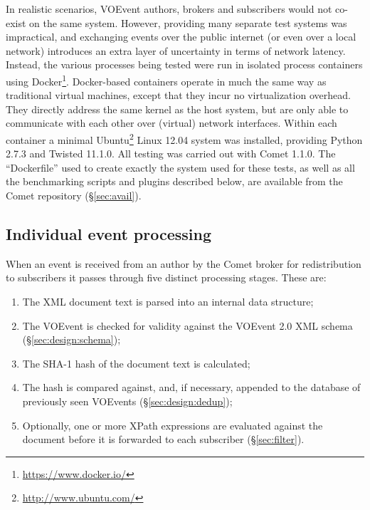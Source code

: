 \documentclass[5p,authoryear]{elsarticle}
\begin{document}
In realistic scenarios, VOEvent authors, brokers and subscribers would not
co-exist on the same system. However, providing many separate test systems was
impractical, and exchanging events over the public internet (or even over a
local network) introduces an extra layer of uncertainty in terms of network
latency. Instead, the various processes being tested were run in isolated
process containers using Docker\footnote{\url{https://www.docker.io/}}.
Docker-based containers operate in much the same way as traditional virtual
machines, except that they incur no virtualization overhead. They directly
address the same kernel as the host system, but are only able to communicate
with each other over (virtual) network interfaces. Within each container a
minimal Ubuntu\footnote{\url{http://www.ubuntu.com/}} Linux 12.04 system was
installed, providing Python 2.7.3 and Twisted 11.1.0. All testing was carried
out with Comet 1.1.0. The ``Dockerfile'' used to create exactly the system
used for these tests, as well as all the benchmarking scripts and plugins
described below, are available from the Comet repository (\S\ref{sec:avail}).

\subsection{Individual event processing}
\label{sec:perf:individual}

When an event is received from an author by the Comet broker for redistribution to
subscribers it passes through five distinct processing stages. These are:

\begin{enumerate}

  \item{The XML document text is parsed into an internal data structure;}

  \item{The VOEvent is checked for validity against the VOEvent 2.0 XML schema
  (\S\ref{sec:design:schema});}

  \item{The SHA-1 hash of the document text is calculated;}

  \item{The hash is compared against, and, if necessary, appended to the
  database of previously seen VOEvents (\S\ref{sec:design:dedup});}

  \item{Optionally, one or more XPath expressions are evaluated against the
  document before it is forwarded to each subscriber (\S\ref{sec:filter}).}

\end{enumerate}
\end{document}
